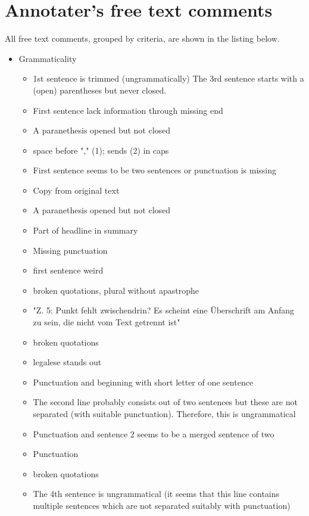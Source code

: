 
\newpage
\appendix

\section{Annotater's free text comments}
\label{appex:freetext}

All free text comments, grouped by criteria, are shown in the listing below.

\begin{itemize}[topsep = 0pt, itemsep = 0pt]
	\item Grammaticality
	\begin{itemize}[topsep = 0pt, itemsep = 0pt]
		\item 1st sentence is trimmed (ungrammatically) The 3rd sentence starts with a (open) parentheses but never closed.
		\item First sentence lack information through missing end
		\item A paranethesis opened but not closed
		\item space before "," (1); sends (2) in caps
		\item First sentence seems to be two sentences or punctuation is missing
		\item Copy from original text
		\item A paranethesis opened but not closed
		\item Part of headline in summary
		\item Missing punctuation
		\item first sentence weird
		\item broken quotations, plural without apastrophe
		\item "Z. 5: Punkt fehlt zwischendrin? Es scheint eine Überschrift am Anfang zu sein, die nicht vom Text getrennt ist"
		\item broken quotations
		\item legalese stands out
		\item Punctuation and beginning with short letter of one sentence
		\item The second line probably consists out of two sentences but these are not separated (with suitable punctuation). Therefore, this is ungrammatical
		\item Punctuation and sentence 2 seems to be a merged sentence of two
		\item Punctuation
		\item broken quotations
		\item The 4th sentence is ungrammatical (it seems that this line contains multiple sentences which are not separated suitably with punctuation)

\end{itemize}
\end{itemize}
